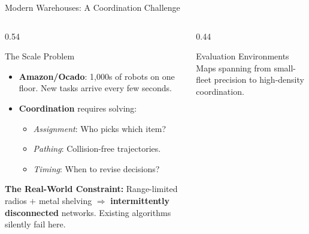 \documentclass[aspectratio=169, 11pt]{beamer}
\newcommand{\smallcap}[1]{{\rmfamily\small\color{TextSecondary} #1}}
\newenvironment{tightitemize}{\begin{itemize}}{\end{itemize}}
\begin{document}
\begin{frame}{Modern Warehouses: A Coordination Challenge}
  \vspace{-20pt}
  \begin{columns}[T]
    \begin{column}{0.54\textwidth}
      \begin{plaincard}[top=4pt, bottom=4pt]{The Scale Problem}
        \begin{tightitemize}
          \item \textbf{Amazon/Ocado}: 1,000s of robots on one floor. New tasks arrive every few seconds.
          \item \textbf{Coordination} requires solving:
            \begin{itemize}
                \item \emph{Assignment}: Who picks which item?
                \item \emph{Pathing}: Collision-free trajectories.
                \item \emph{Timing}: When to revise decisions?
            \end{itemize}
        \end{tightitemize}
      \end{plaincard}
      
      \vspace{2pt}
      
      \begin{warnbox}[top=4pt, bottom=4pt]
        \textbf{The Real-World Constraint:} Range-limited radios $+$ metal shelving $\Rightarrow$ \textbf{intermittently disconnected} networks. Existing algorithms silently fail here.
      \end{warnbox}
    \end{column}

    \begin{column}{0.44\textwidth}
      \begin{plaincard}[top=4pt, bottom=4pt]{Evaluation Environments}
        \smallcap{Maps spanning from small-fleet precision to high-density coordination.}
      \end{plaincard}
      
      \vspace{2pt}
      

\end{column}
\end{columns}
\end{frame}
\end{document}
